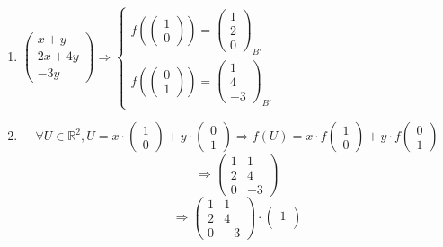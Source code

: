 \documentclass[notitlepage]{math}
\begin{document}
\begin{enumerate}[label=\protect\circled{\arabic*}]
    \item $\begin{pmatrix}
        x + y \\
        2x + 4y \\
        -3y
    \end{pmatrix} \Rightarrow \begin{cases}
        f(\begin{pmatrix} 1 \\ 0 \end{pmatrix}) = {\begin{pmatrix} 1 \\ 2 \\ 0 \end{pmatrix}}_{B'} \\
        f(\begin{pmatrix} 0 \\ 1 \end{pmatrix}) = {\begin{pmatrix} 1 \\ 4 \\ -3 \end{pmatrix}}_{B'}
    \end{cases}$
    \item \[\forall U \in \mathbb{R}^2, U = x \cdot \begin{pmatrix} 1 \\ 0 \end{pmatrix} + y \cdot \begin{pmatrix} 0 \\ 1 \end{pmatrix} \Rightarrow f(U) = x \cdot f \begin{pmatrix} 1 \\ 0 \end{pmatrix} + y \cdot f \begin{pmatrix} 0 \\ 1 \end{pmatrix}\]
    \[ \Rightarrow \begin{pmatrix}
        1 & 1 \\
        2 & 4 \\
        0 & -3
    \end{pmatrix}\]
    \[ \Rightarrow \begin{pmatrix}
        1 & 1 \\
        2 & 4 \\
        0 & -3
    \end{pmatrix} \cdot \begin{pmatrix}
        1 \\

\end{pmatrix}\]
\end{enumerate}
\end{document}
